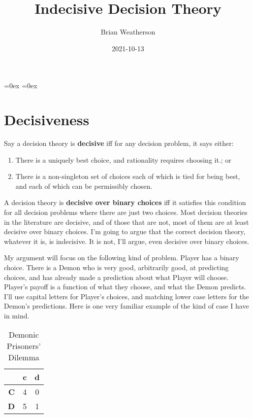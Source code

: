\documentclass[
  12pt,
]{article}
\title{Indecisive Decision Theory}
\author{Brian Weatherson}
\date{2021-10-13}
\providecommand{\tightlist}{%
  \setlength{\itemsep}{0pt}\setlength{\parskip}{0pt}}
\begin{document}
\maketitle

\setlength\heavyrulewidth{0ex}
\setlength\lightrulewidth{0.08ex}

\aboverulesep=0ex
\belowrulesep=0ex
\renewcommand{\arraystretch}{1.2}
\hypersetup{hidelinks}

\renewcommand\refname{References}

\captionsetup{labelformat=empty, font = small, font = bf, position = below}

\hypertarget{decisiveness}{%
\section{Decisiveness}\label{decisiveness}}

Say a decision theory is \textbf{decisive} iff for any decision problem,
it says either:

\begin{enumerate}
\def\labelenumi{\arabic{enumi}.}
\tightlist
\item
  There is a uniquely best choice, and rationality requires choosing
  it.; or
\item
  There is a non-singleton set of choices each of which is tied for
  being best, and each of which can be permissibly chosen.
\end{enumerate}

A decision theory is \textbf{decisive over binary choices} iff it
satisfies this condition for all decision problems where there are just
two choices. Most decision theories in the literature are decisive, and
of those that are not, most of them are at least decisive over binary
choices. I'm going to argue that the correct decision theory, whatever
it is, is indecisive. It is not, I'll argue, even decisive over binary
choices.

My argument will focus on the following kind of problem. Player has a
binary choice. There is a Demon who is very good, arbitrarily good, at
predicting choices, and has already made a prediction about what Player
will choose. Player's payoff is a function of what they choose, and what
the Demon predicts. I'll use capital letters for Player's choices, and
matching lower case letters for the Demon's predictions. Here is one
very familiar example of the kind of case I have in mind.

\begin{table}[H]

\caption{\label{tab:unnamed-chunk-2}Demonic Prisoners' Dilemma}
\centering
\begin{tabular}[t]{>{}r|cc}

\textbf{} & \textbf{c} & \textbf{d}\\
\midrule
\textbf{C} & 4 & 0\\
\textbf{D} & 5 & 1\\

\end{tabular}
\end{table}
\end{document}
